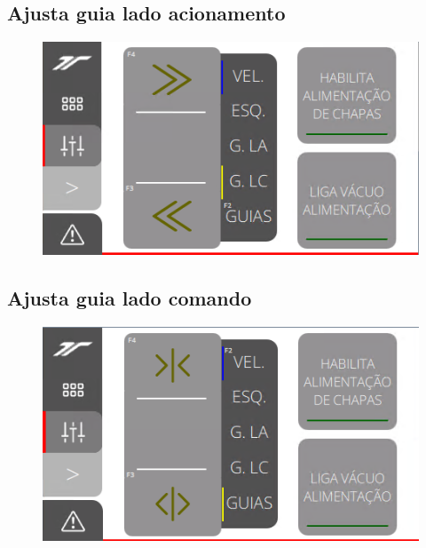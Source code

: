 \subsection{\small Ajusta guia lado acionamento}
\begin{figure}
    \centering
    \includegraphics{src/imagesICV/11-KTP400-Feeder/7.png}
\end{figure}

\newpage
\thispagestyle{fancy}
\vspace{\fill}
\subsection{\small Ajusta guia lado comando}
\begin{figure}
    \centering
    \includegraphics{src/imagesICV/11-KTP400-Feeder/8.png}
\end{figure}

\newpage
\thispagestyle{fancy}
\vspace{\fill}
